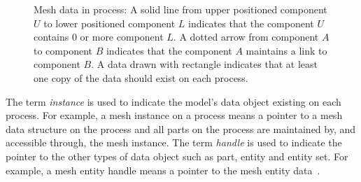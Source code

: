 \begin{figure}
\begin{center}
\begin{scriptsize}
\end{scriptsize}
\end{center}
\caption{Mesh data in process: A solid line from upper positioned component $U$ 
to lower positioned component $L$ indicates that the component $U$ contains 0 or 
more component $L$. A dotted arrow from component $A$ to component $B$ indicates 
that the component $A$ maintains a link to component $B$. A data drawn with 
rectangle indicates that at least one copy of the data should exist on each 
process.}
\label{fig:pumi-datamodel}
\end{figure}

The term 
\emph{instance} is used to indicate the model's data object existing on each process. For 
example, a mesh instance on a process means a pointer to a mesh data structure 
on the process and all parts on the process are maintained by, and accessible 
through, the mesh instance. The term \emph{handle} is used to indicate the 
pointer to the other types of data object such as part, entity and entity set. For example, a 
mesh entity handle means a pointer to the mesh entity data~\cite{fmdb06,imesh10,pumi12,itapsweb}. 
